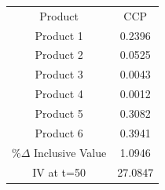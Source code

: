 \begin{tabular}{cc}
Product & CCP \\
Product 1 & 0.2396 \\
Product 2 & 0.0525 \\
Product 3 & 0.0043 \\
Product 4 & 0.0012 \\
Product 5 & 0.3082 \\
Product 6 & 0.3941 \\
$\%\Delta$ Inclusive Value & 1.0946 \\
IV at t=50 & 27.0847 \\
\end{tabular}